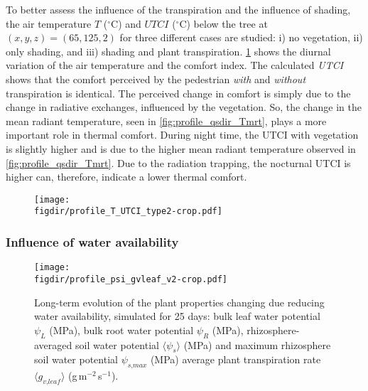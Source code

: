 To better assess the influence of the transpiration and the influence of shading, the air temperature $T$  ($^{\circ}$C) and $UTCI$  ($^{\circ}$C) below the tree at $(x,y,z) = (65, 125, 2)$ for three different cases are studied: i) no vegetation, ii) only shading, and iii) shading and plant transpiration. \cref{fig:profile_T_UTCI} shows the diurnal variation of the air temperature and the comfort index. The calculated \textit{UTCI} shows that the comfort perceived by the pedestrian \textit{with} and \textit{without} transpiration is identical. The perceived change in comfort is simply due to the change in radiative exchanges, influenced by the vegetation. So, the change in the mean radiant temperature, seen in \cref{fig:profile_qsdir_Tmrt}, plays a more important role in thermal comfort. During night time, the UTCI with vegetation is slightly higher and is due to the higher mean radiant temperature observed in \cref{fig:profile_qsdir_Tmrt}. Due to the radiation trapping, the nocturnal UTCI is higher can, therefore, indicate a lower thermal comfort. 

\begin{figure}[t]
	\centering
	\texttt{[image: \\figdir/profile\_T\_UTCI\_type2-crop.pdf]}
	\caption{}
	\label{fig:profile_T_UTCI}
\end{figure}


\subsubsection*{Influence of water availability}

\begin{figure}[p]
	\centering
	\texttt{[image: \\figdir/profile\_psi\_gvleaf\_v2-crop.pdf]}
	\caption{Long-term evolution of the plant properties changing due reducing water availability, simulated for 25 days:  bulk leaf water potential $\psi_L$ (MPa), bulk root water potential $\psi_R$ (MPa), rhizosphere-averaged soil water potential $\langle \psi_s \rangle$ (MPa) and maximum rhizosphere soil water potential $\psi_{\textit{s,max}}$ (MPa)  average plant transpiration rate $\langle g_{\textit{v,leaf}} \rangle$ (g\,m$^{-2}$\,s$^{-1}$). }
	\label{fig:profile_psi_gvleaf}
\end{figure}

